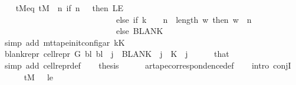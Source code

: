 \begin{isabellebody}
\ \ \isamarkupfalse%
\ tM{\isacharprime}{\kern0pt}{\isacharunderscore}{\kern0pt}eq{\isacharcolon}{\kern0pt}\ {\isachardoublequoteopen}{\isacharquery}{\kern0pt}tM{\isacharprime}{\kern0pt}\ {\isacharequal}{\kern0pt}\ {\isacharparenleft}{\kern0pt}{\isasymlambda}n{\isachardot}{\kern0pt}\ if\ n\ {\isacharequal}{\kern0pt}\ {}\ then\ LE{}\isanewline
\ \ \ \ \ \ \ \ \ \ \ \ \ \ \ \ \ \ \ \ \ \ \ \ \ \ \ \ else\ if\ k\ {\isacharequal}{\kern0pt}\ {}\ {\isasymand}\ n\ {\isasymle}\ length\ {\isacharquery}{\kern0pt}w{\isacharprime}{\kern0pt}\ then\ {\isacharquery}{\kern0pt}w{\isacharprime}{\kern0pt}\ {\isacharbang}{\kern0pt}\ {\isacharparenleft}{\kern0pt}n\ {\isacharminus}{\kern0pt}\ {}{\isacharparenright}{\kern0pt}\isanewline
\ \ \ \ \ \ \ \ \ \ \ \ \ \ \ \ \ \ \ \ \ \ \ \ \ \ \ \ else\ BLANK{}{\isacharparenright}{\kern0pt}{\isachardoublequoteclose}\isanewline
\ \ \ \ \isamarkupfalse%
\ {\isacharparenleft}{\kern0pt}simp\ add{\isacharcolon}{\kern0pt}\ mt{\isacharunderscore}{\kern0pt}tape{\isacharunderscore}{\kern0pt}init{\isacharunderscore}{\kern0pt}config{\isacharunderscore}{\kern0pt}ar\ kK{\isacharparenright}{\kern0pt}\isanewline
\ \ \isamarkupfalse%
\ blank{\isacharunderscore}{\kern0pt}repr{\isacharcolon}{\kern0pt}\ {\isachardoublequoteopen}cell{\isacharunderscore}{\kern0pt}repr\ {\isacharquery}{\kern0pt}G\ {\isacharquery}{\kern0pt}bl\ {\isacharquery}{\kern0pt}bl\ {\isacharbang}{\kern0pt}\ j\ {\isacharequal}{\kern0pt}\ BLANK{}{\isachardoublequoteclose}\ \ {\isachardoublequoteopen}j\ {\isacharless}{\kern0pt}\ {\isacharquery}{\kern0pt}K{\isachardoublequoteclose}\ \ j\isanewline
\ \ \ \ \isamarkupfalse%
\ that\ \isamarkupfalse%
\ {\isacharparenleft}{\kern0pt}simp\ add{\isacharcolon}{\kern0pt}\ cell{\isacharunderscore}{\kern0pt}repr{\isacharunderscore}{\kern0pt}def{\isacharparenright}{\kern0pt}\isanewline
\ \ \isamarkupfalse%
\ {\isacharquery}{\kern0pt}thesis\isanewline
\ \ \ \ \isamarkupfalse%
\ ar{\isacharunderscore}{\kern0pt}tape{\isacharunderscore}{\kern0pt}correspondence{\isacharunderscore}{\kern0pt}def\isanewline
\ \ \isamarkupfalse%
\ {\isacharparenleft}{\kern0pt}intro\ conjI{\isacharparenright}{\kern0pt}\isanewline
\ \ \ \ \isamarkupfalse%
\ {\isachardoublequoteopen}{\isacharquery}{\kern0pt}tM\ {}\ {\isacharequal}{\kern0pt}\ {\isacharquery}{\kern0pt}le{\isachardoublequoteclose}\ \isamarkupfalse%

\end{isabellebody}
